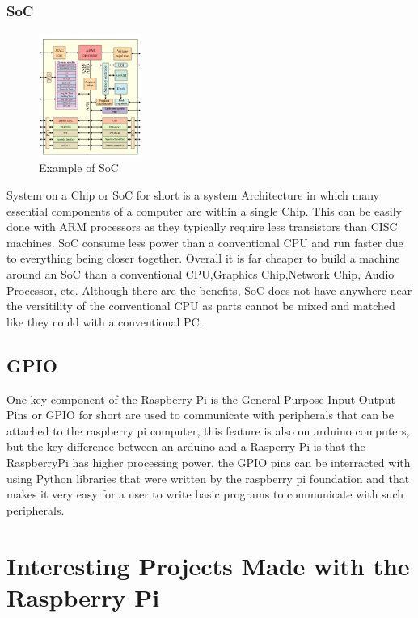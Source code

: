 \documentclass{article}
\begin{document}
	\subsubsection{SoC}
		\begin{figure}[h!]
			\centering
			\includegraphics[width=0.3\textwidth]{ARMSoCBlockDiagram.png}
			\caption{Example of SoC \citep{cburnett}}
		\end{figure}
	System on a Chip or SoC for short is a system Architecture in which many essential components of a computer are within a single Chip. This can be easily done with ARM processors as they typically require less transistors than CISC machines. SoC consume less power than a conventional CPU and run faster due to everything being closer together. Overall it is far cheaper to build a machine around an SoC than a conventional CPU,Graphics Chip,Network Chip, Audio Processor, etc. Although there are the benefits, SoC does not have anywhere near the versitility of the conventional CPU as parts cannot be mixed and matched like they could with a conventional PC. 
	\subsection{GPIO}
	One key component of the Raspberry Pi is the General Purpose Input Output Pins or GPIO for short are used to communicate with peripherals that can be attached to the raspberry pi computer, this feature is also on arduino computers, but the key difference between an arduino and a Rasperry Pi is that the RaspberryPi has higher processing power. the GPIO pins can be interracted with using Python libraries that were written by the raspberry pi foundation and that makes it very easy for a user to write basic programs to communicate with such peripherals.
	\newpage
	\section{Interesting Projects Made with the Raspberry Pi}
\end{document}
